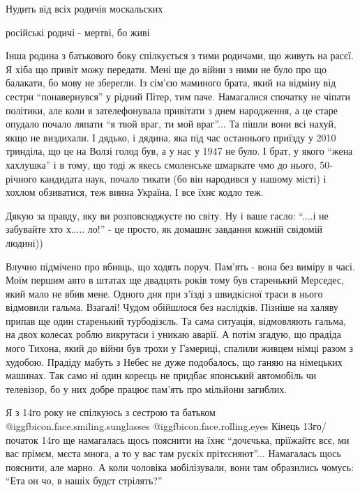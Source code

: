 \begin{itemize}
Нудить від всіх родичів москальских

російські родичі - мертві, бо живі


Інша родина з батькового боку спілкується з тими родичами, що живуть на расєї.
Я хіба що привіт можу передати. Мені ще до війни з ними не було про що
балакати, бо мову не зберегли. Із сім'єю маминого брата, який на відміну від
сестри \enquote{понавернувся} у рідний Пітер, тим паче. Намагалися спочатку не чіпати
політики, але коли я зателефонувала привітати з днем народження, а це старе
опудало почало ляпати \enquote{я твой враг, ти мой враг}... Та пішли вони всі нахуй,
якщо не виздихали. І дядько, і дядина, яка під час останнього приїзду у 2010
тринділа, що це на Волзі голод був, а у нас у 1947 не було. І брат, у якого
\enquote{жена хахлушка} і в тому, що тоді ж якесь смоленське шмаркате чмо до нього,
50-річного кандидата наук, почало тикати (бо він народився у нашому місті) і
хохлом обзиватися, теж винна Україна. І все їхнє кодло теж.


Дякую за правду, яку ви розповсюджуєте по світу. Ну і ваше гасло: \enquote{....і не
забувайте хто х..... ло!} - це просто, як домашнє завдання кожній свідомій
людині))


Влучно підмічено про вбивць, що ходять поруч. Пам’ять - вона без виміру в часі.
Моїм першим авто в штатах ще двадцять років тому був старенький Мерседес, який
мало не вбив мене. Одного дня при з’їзді з швидкісної траси в нього відмовили
гальма. Взагалі! Чудом обійшлося без наслідків. Пізніше на халяву припав ще
один старенький турбодізєль. Та сама ситуація, відмовляють гальма, на двох
колесах роблю викрутаси і уникаю аварії. А потім згадую, що прадіда мого
Тихона, який до війни був трохи у Гамериці, спалили живцем німці разом з
худобою. Прадіду мабуть з Небес не дуже подобалось, що ганяю на німецьких
машинах. Так само ні один кореєць не придбає японський автомобіль чи телевізор,
бо у них добре працює пам’ять про мільйони загиблих.


Я з 14го року не спілкуюсь з сестрою та батьком
@igg{fbicon.face.smiling.sunglasses}  @igg{fbicon.face.rolling.eyes}  Кінець
13го/початок 14го ще намагалась щось пояснити на їхнє \enquote{дочєчька,
пріїжайтє всє, ми вас прімєм, мєста многа, а то у вас там рускіх прітєсняют}...
Намагалась щось пояснити, але марно. А коли чоловіка мобілізували, вони там
образились чомусь: \enquote{Ета он чо, в нашіх будєт стрілять?}


\end{itemize}
